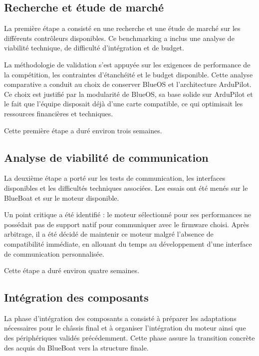 \documentclass[11pt,letterpaper]{article}
\begin{document}
\subsection{Recherche et étude de marché}

La première étape a consisté en une recherche et une étude de marché sur les différents contrôleurs disponibles. Ce benchmarking a inclus une analyse de viabilité technique, de difficulté d'intégration et de budget.

La méthodologie de validation s'est appuyée sur les exigences de performance de la compétition, les contraintes d'étanchéité et le budget disponible. Cette analyse comparative a conduit au choix de conserver BlueOS et l'architecture ArduPilot. Ce choix est justifié par la modularité de BlueOS, sa base solide sur ArduPilot et le fait que l'équipe disposait déjà d'une carte compatible, ce qui optimisait les ressources financières et techniques.

Cette première étape a duré environ trois semaines.

\subsection{Analyse de viabilité de communication}

La deuxième étape a porté sur les tests de communication, les interfaces disponibles et les difficultés techniques associées. Les essais ont été menés sur le BlueBoat et sur le moteur disponible.

Un point critique a été identifié : le moteur sélectionné pour ses performances ne possédait pas de support natif pour communiquer avec le firmware choisi. Après arbitrage, il a été décidé de maintenir ce moteur malgré l'absence de compatibilité immédiate, en allouant du temps au développement d'une interface de communication personnalisée.

Cette étape a duré environ quatre semaines.

\subsection{Intégration des composants}

La phase d'intégration des composants a consisté à préparer les adaptations nécessaires pour le châssis final et à organiser l'intégration du moteur ainsi que des périphériques validés précédemment. Cette phase assure la transition concrète des acquis du BlueBoat vers la structure finale.
\end{document}
